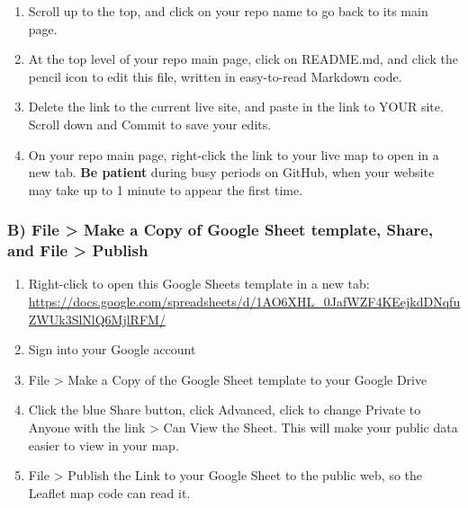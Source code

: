\documentclass[
  english,
]{book}
\begin{document}
\begin{enumerate}
\def\labelenumi{\arabic{enumi})}
\setcounter{enumi}{5}
\item
  Scroll up to the top, and click on your repo name to go back to its main page.
\item
  At the top level of your repo main page, click on README.md, and click the pencil icon to edit this file, written in easy-to-read Markdown code.
\item
  Delete the link to the current live site, and paste in the link to YOUR site. Scroll down and Commit to save your edits.
\item
  On your repo main page, right-click the link to your live map to open in a new tab. \textbf{Be patient} during busy periods on GitHub, when your website may take up to 1 minute to appear the first time.
\end{enumerate}

\hypertarget{b-file-make-a-copy-of-google-sheet-template-share-and-file-publish-1}{%
\subsubsection*{B) File \textgreater{} Make a Copy of Google Sheet template, Share, and File \textgreater{} Publish}\label{b-file-make-a-copy-of-google-sheet-template-share-and-file-publish-1}}

\begin{enumerate}
\def\labelenumi{\arabic{enumi})}
\item
  Right-click to open this Google Sheets template in a new tab: \url{https://docs.google.com/spreadsheets/d/1AO6XHL_0JafWZF4KEejkdDNqfuZWUk3SlNlQ6MjlRFM/}
\item
  Sign into your Google account
\item
  File \textgreater{} Make a Copy of the Google Sheet template to your Google Drive
\item
  Click the blue Share button, click Advanced, click to change Private to Anyone with the link \textgreater{} Can View the Sheet. This will make your public data easier to view in your map.
\item
  File \textgreater{} Publish the Link to your Google Sheet to the public web, so the Leaflet map code can read it.
\end{enumerate}
\end{document}
